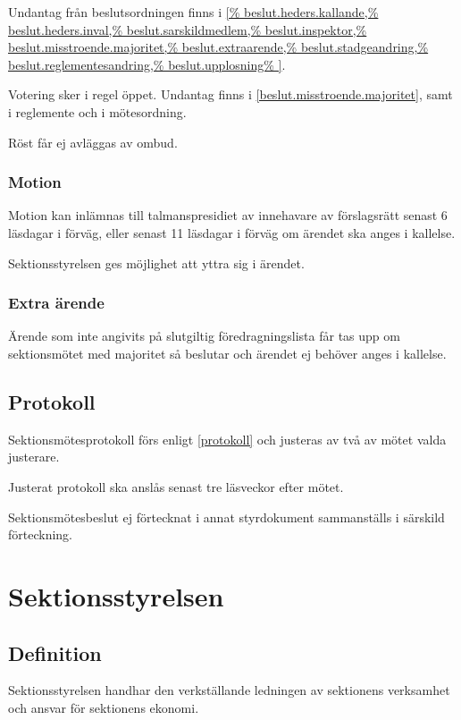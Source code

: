 \documentclass{styrdokument}
\begin{document}
\? Undantag från beslutsordningen finns i
\cref{%
  beslut.heders.kallande,%
  beslut.heders.inval,%
  beslut.sarskildmedlem,%
  beslut.inspektor,%
  beslut.misstroende.majoritet,%
  beslut.extraarende,%
  beslut.stadgeandring,%
  beslut.reglementesandring,%
  beslut.upplosning%
}.
  
\? Votering sker i regel öppet. Undantag finns i
\cref{beslut.misstroende.majoritet},
samt i reglemente och i mötesordning.

\? Röst får ej avläggas av ombud.

\subsubsection{Motion}
\? Motion kan inlämnas till talmanspresidiet av innehavare av förslagsrätt senast 6 läsdagar i förväg, eller senast 11 läsdagar i förväg om ärendet ska anges i kallelse.

\? Sektionsstyrelsen ges möjlighet att yttra sig i ärendet.

\subsubsection{Extra ärende}
\? Ärende som inte angivits på slutgiltig föredragningslista får tas upp om sektionsmötet med  majoritet så beslutar och ärendet ej behöver anges i kallelse.
\label{beslut.extraarende}
  
\subsection{Protokoll}
\? Sektionsmötesprotokoll förs enligt \cref{protokoll} och justeras av två av mötet valda justerare.

\? Justerat protokoll ska anslås senast tre läsveckor efter mötet.

\? Sektionsmötesbeslut ej förtecknat i annat styrdokument sammanställs i särskild förteckning.

\section{Sektionsstyrelsen}
\subsection{Definition}

\? Sektionsstyrelsen handhar den verkställande ledningen av sektionens verksamhet och ansvar för sektionens ekonomi.
\end{document}
